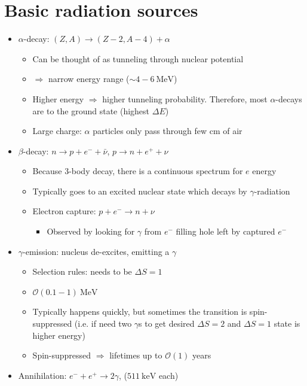 \documentclass[11pt]{article}
\newcommand{\nubar}{{\bar{\nu}}}
\newcommand{\kev}{\text{keV}}
\newcommand{\mev}{\text{MeV}}
\newcommand{\el}{\ensuremath{e^{-}}\xspace}
\newcommand{\pos}{\ensuremath{e^{+}}\xspace}
\newcommand{\ord}[1]{\ensuremath{\mathcal{O}(#1)}}
\begin{document}
\section{Basic radiation sources}
\begin{itemize}
  \item $\alpha$-decay: $(Z,A)\rightarrow(Z-2,A-4)+\alpha$
  \begin{itemize}
    \item Can be thought of as tunneling through nuclear potential
    \item $\Rightarrow$ narrow energy range ($\sim4-6~\mev$)
    \item Higher energy $\Rightarrow$ higher tunneling probability. Therefore, most $\alpha$-decays are to the ground state (highest $\Delta E$)
    \item Large charge: $\alpha$ particles only pass through few cm of air
  \end{itemize}
  \item $\beta$-decay: $n\rightarrow p+e^- + \nubar$, $p\rightarrow n+e^+ + \nu$
  \begin{itemize}
    \item Because $3$-body decay, there is a continuous spectrum for $e$ energy
    \item Typically goes to an excited nuclear state which decays by $\gamma$-radiation
    \item Electron capture: $p+\el\rightarrow n+\nu$
    \begin{itemize}
      \item Observed by looking for $\gamma$ from $\el$ filling hole left by captured $\el$
    \end{itemize}
  \end{itemize}
  \item $\gamma$-emission: nucleus de-excites, emitting a $\gamma$
  \begin{itemize}
    \item Selection rules: needs to be $\Delta S = 1$
    \item $\ord{0.1-1}~\mev$
    \item Typically happens quickly, but sometimes the transition is spin-suppressed (i.e. if need two $\gamma$s to get desired $\Delta S=2$ and $\Delta S=1$ state is higher energy)
    \item Spin-suppressed $\Rightarrow$ lifetimes up to $\ord 1 $ years
  \end{itemize}
  \item Annihilation: $\el+\pos\rightarrow2\gamma$, ($511~\kev$ each)

\end{itemize}
\end{document}
